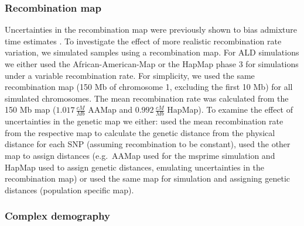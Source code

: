 \documentclass[]{article}
\begin{document}
\subsubsection{Recombination map}\label{recombination map}

Uncertainties in the recombination map were previously shown to bias
admixture time estimates \citep{sankararaman_date_2012,sankararaman_combined_2016,fu_genome_2014}. To investigate the effect of more realistic
recombination rate variation, we simulated samples using a recombination map. For ALD simulations we
either used the African-American-Map \citep{hinch_landscape_2011} or
the HapMap phase 3 \citep{HapMapConsortium_second_2007} for simulations
under a variable recombination rate. For simplicity, we used the same
recombination map (150 Mb of chromosome 1, excluding the first 10 Mb)
for all simulated chromosomes. The mean recombination rate was
calculated from the 150 Mb map (\(1.017 \, \frac{cM}{Mb}\) AAMap and
\(0.992 \, \frac{cM}{Mb}\) HapMap). To examine the effect of uncertainties in the
genetic map we either: used the mean recombination rate from the
respective map to calculate the genetic distance from the physical
distance for each SNP (assuming recombination to be constant), used the other map to assign distances
(e.g.~AAMap used for the msprime simulation and HapMap used to assign
genetic distances, emulating uncertainties in the recombination map) or used the same map for simulation and assigning
genetic distances (population specific map). 

\subsubsection{Complex demography}\label{inferred demography}
\end{document}
